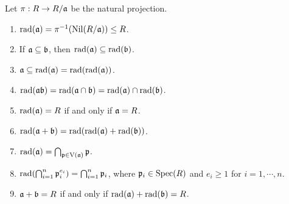 \begin{fact}
    Let $\pi: R \to R/\mathfrak{a}$ be the natural projection.
    \begin{enumerate}
        \item $\operatorname{rad}(\mathfrak{a}) = \pi^{-1}(\operatorname{Nil}(R/\mathfrak{a})) \leq R$. 
        \item If $\mathfrak{a} \subseteq \mathfrak{b}$, then $\operatorname{rad}(\mathfrak{a}) \subseteq \operatorname{rad}(\mathfrak{b})$. 
        \item $\mathfrak{a} \subseteq \operatorname{rad}(\mathfrak{a}) = \operatorname{rad}(\operatorname{rad}(\mathfrak{a}))$. 
        \item $\operatorname{rad}(\mathfrak{a}\mathfrak{b}) = \operatorname{rad}(\mathfrak{a} \cap \mathfrak{b}) = \operatorname{rad}(\mathfrak{a}) \cap \operatorname{rad}(\mathfrak{b})$.
        \item $\operatorname{rad}(\mathfrak{a}) = R$ if and only if $\mathfrak{a} = R$.
        \item $\operatorname{rad}(\mathfrak{a} + \mathfrak{b}) = \operatorname{rad}(\operatorname{rad}(\mathfrak{a}) + \operatorname{rad}(\mathfrak{b}))$.
        \item $\operatorname{rad}(\mathfrak{a}) = \bigcap_{\mathfrak{p} \in \operatorname{V}(\mathfrak{a})} \mathfrak{p}$. 
        \item $\operatorname{rad}(\bigcap_{i=1}^n \mathfrak{p}_i^{e_i}) = \bigcap_{i=1}^n \mathfrak{p}_i$, where $\mathfrak{p}_i \in \operatorname{Spec}(R)$ and $e_i \geq 1$ for $i = 1,\cdots,n$.
        \item $\mathfrak{a} + \mathfrak{b} = R$ if and only if $\operatorname{rad}(\mathfrak{a}) + \operatorname{rad}(\mathfrak{b}) = R$. 
    \end{enumerate}
\end{fact}

